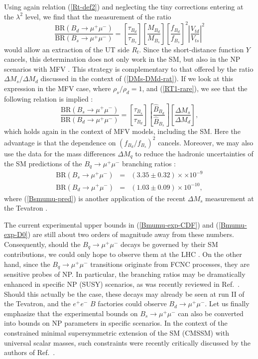 \documentclass[12pt]{article}
\begin{document}
Using again relation (\ref{Rt-def2}) and neglecting the tiny corrections entering
at the $\lambda^2$ level, we find that the measurement of the ratio
\begin{equation}\label{RT1-rare}
\frac{\mbox{BR}(B_d\to\mu^+\mu^-)}{\mbox{BR}(B_s\to\mu^+\mu^-)}=
\left[\frac{\tau_{B_d}}{\tau_{B_s}}\right]
\left[\frac{M_{B_d}}{M_{B_s}}\right]
\left[\frac{f_{B_d}}{f_{B_s}}\right]^2
\left|\frac{V_{td}}{V_{ts}}\right|^2
\end{equation}
would allow an extraction of the UT side $R_t$. Since the short-distance
function $Y$ cancels, this determination does not only work in the SM,
but also in the NP scenarios with MFV \cite{buras-MFV}. This
strategy is complementary to that offered by the ratio $\Delta M_s/\Delta M_d$
discussed in the context of (\ref{DMs-DMd-rat}). If we look at this
expression  in the MFV case, where $\rho_s/\rho_d=1$, 
and  (\ref{RT1-rare}), we see that the following relation is implied \cite{Buras-rel}:
\begin{equation}\label{Bmumu-DM-rel}
\frac{\mbox{BR}(B_s\to\mu^+\mu^-)}{\mbox{BR}(B_d\to\mu^+\mu^-)}=
\left[\frac{\tau_{B_s}}{\tau_{B_d}}\right]
\left[\frac{\hat B_{B_d}}{\hat B_{B_s}}\right]
\left[\frac{\Delta M_s}{\Delta M_d}\right],
\end{equation}
which holds again in the context of MFV models, including the SM. 
Here the advantage is that the dependence on $(f_{B_d}/f_{B_s})^2$ cancels. 
Moreover, we may also use the data for the mass differences
$\Delta M_q$ to reduce the hadronic uncertainties 
of the SM predictions of the $B_q\to\mu^+\mu^-$ branching ratios 
\cite{Buras-rel}:
\begin{eqnarray}
\mbox{BR}(B_s \to \mu^+ \mu^-) &=& (3.35 \pm 0.32)\times\times 
10^{-9}\label{Bsmumu-pred}\\
\mbox{BR}(B_d\to \mu^+ \mu^-) &=& (1.03 \pm 0.09)\times 10^{-10},
\end{eqnarray}
where (\ref{Bsmumu-pred}) is another application of the recent $\Delta M_s$ 
measurement at the Tevatron \cite{BBGT}.

The current experimental upper bounds in (\ref{Bmumu-exp-CDF}) 
and  (\ref{Bmumu-exp-D0}) are still about two
orders of magnitude away from these numbers. 
Consequently, should the $B_q \to \mu^+ \mu^-$ decays 
be governed by their SM contributions, we could only 
hope to observe them at the LHC \cite{LHC-Book}.
On the other hand, since the $B_q \to \mu^+ \mu^-$ transitions originate from 
FCNC processes, they are sensitive probes of NP. In particular, 
the branching ratios may be dramatically enhanced in specific NP (SUSY) 
scenarios, as was recently reviewed in Ref.~\cite{buras-NP}. Should this 
actually be the case, these decays may already be seen at run II of the 
Tevatron, and the $e^+e^-$ $B$ factories could observe $B_d\to \mu^+ \mu^-$. 
Let us finally emphasize that the experimental bounds on 
$B_s\to\mu^+\mu^-$ can also be converted into bounds on NP parameters
in specific scenarios. In the context of the constrained minimal 
supersymmetric extension 
of the SM (CMSSM) with universal scalar masses, such constraints were
recently critically  discussed by the authors of Ref.~\cite{EOS}.
\end{document}
